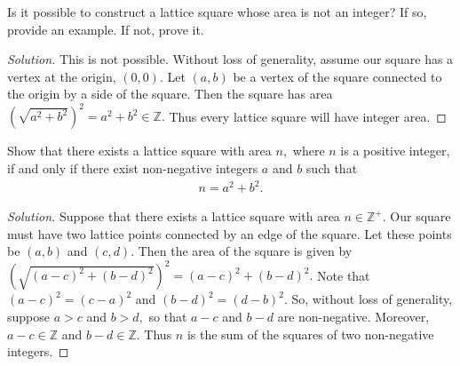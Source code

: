 \documentclass[12pt]{article}
\newcommand{\Z}{\mathbb{Z}}
\newenvironment{exercise}[2][Exercise]{\begin{trivlist}
        \item[\hskip \labelsep {\bfseries #1}\hskip \labelsep {\bfseries #2.}]}{\end{trivlist}}
\newenvironment{solution}
        {\begin{proof}[Solution]}
                    {\end{proof}}
\begin{document}
\begin{exercise}{9}
    Is it possible to construct a lattice square whose area is not an integer? If so, provide an example. If not, prove it.
    \begin{solution}
        This is not possible. Without loss of generality, assume our square has a vertex at the origin, \( (0,0) \). Let \( ( a,b ) \) be a vertex of the square connected to the origin by a side of the square. Then the square has area \( ( \sqrt{a^{2} + b^{2}} )^{2} = a^{2} + b^{2} \in \Z.  \) Thus every lattice square will have integer area.
    \end{solution}
\end{exercise}

\begin{exercise}{10}
    Show that there exists a lattice square with area \( n  ,\) where \( n \) is a positive integer, if and only if there exist non-negative integers \( a \) and \( b \) such that
    \begin{align*}
        n = a^{2} + b^{2} .
    \end{align*}
    \begin{solution}
        Suppose that there exists a lattice square with area \( n\in \Z^{+} . \) Our square must have two lattice points connected by an edge of the square. Let these points be \( ( a,b ) \) and \( ( c,d ) . \) Then the area of the square is given by \( ( \sqrt{( a-c )^{2} + ( b-d )^{2}} )^{2} = ( a-c )^{2} + ( b-d )^{2}. \) Note that \( ( a-c )^{2} = ( c-a )^{2} \) and \( ( b-d )^{2} = ( d-b )^{2} . \) So, without loss of generality, suppose \( a>c \) and \( b>d, \) so that \( a-c \) and \( b-d \) are non-negative. Moreover, \( a-c \in \Z \) and \( b-d \in \Z. \) Thus \( n \) is the sum of the squares of two non-negative integers.


\end{solution}
\end{exercise}
\end{document}
